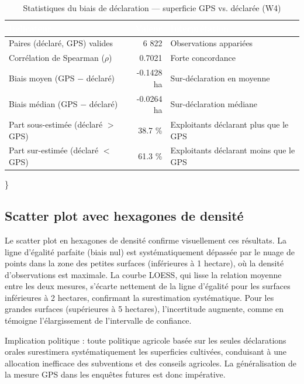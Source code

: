 \documentclass[
  french,
  10pt,
]{article}
\begin{document}
\begin{table}

\caption{\label{tab:biais-table}Statistiques du biais de déclaration --- superficie GPS vs. déclarée (W4)}
\centering
\begin{tabular}[t]{lrl}
\toprule
\cellcolor{NavyBlue}\textcolor{white}{\textbf{Indicateur}} & \cellcolor{NavyBlue}\textcolor{white}{\textbf{Valeur}} & \cellcolor{NavyBlue}\textcolor{white}{\textbf{Interprétation}}\\
\midrule
Paires (déclaré, GPS) valides & 6 822 & Observations appariées\\
Corrélation de Spearman ($\rho$) & 0.7021 & Forte concordance\\
Biais moyen (GPS $-$ déclaré) & -0.1428 ha & Sur-déclaration en moyenne\\
Biais médian (GPS $-$ déclaré) & -0.0264 ha & Sur-déclaration médiane\\
Part sous-estimée (déclaré $>$ GPS) & 38.7 \% & Exploitants déclarant plus que le GPS\\
Part sur-estimée (déclaré $<$ GPS) & 61.3 \% & Exploitants déclarant moins que le GPS\\
\bottomrule
\end{tabular}
\end{table}

\}

\subsection{Scatter plot avec hexagones de
densité}\label{scatter-plot-avec-hexagones-de-densituxe9}

Le scatter plot en hexagones de densité confirme visuellement ces
résultats. La ligne d'égalité parfaite (biais nul) est systématiquement
dépassée par le nuage de points dans la zone des petites surfaces
(inférieures à 1 hectare), où la densité d'observations est maximale. La
courbe LOESS, qui lisse la relation moyenne entre les deux mesures,
s'écarte nettement de la ligne d'égalité pour les surfaces inférieures à
2 hectares, confirmant la surestimation systématique. Pour les grandes
surfaces (supérieures à 5 hectares), l'incertitude augmente, comme en
témoigne l'élargissement de l'intervalle de confiance.

Implication politique : toute politique agricole basée sur les seules
déclarations orales surestimera systématiquement les superficies
cultivées, conduisant à une allocation inefficace des subventions et des
conseils agricoles. La généralisation de la mesure GPS dans les enquêtes
futures est donc impérative.
\end{document}
